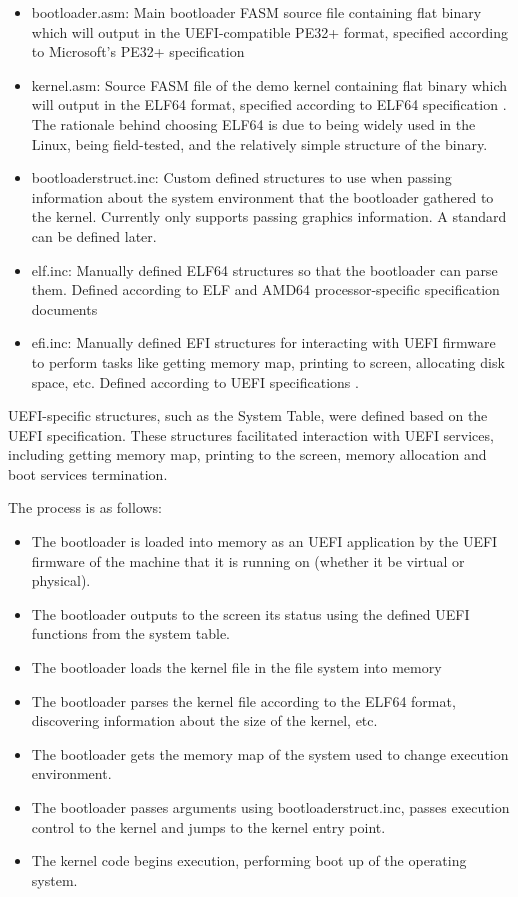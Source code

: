 \documentclass[conference]{IEEEtran}
\begin{document}
\begin{itemize}
    \item bootloader.asm: Main bootloader FASM source file containing flat binary which will output in the UEFI-compatible PE32+ format, specified according to Microsoft's PE32+ specification \cite{pe}
    \item kernel.asm: Source FASM file of the demo kernel containing flat binary which will output in the ELF64 format, specified according to ELF64 specification \cite{elflatest}. The rationale behind choosing ELF64 is due to being widely used in the Linux, being field-tested, and the relatively simple structure of the binary.
    \item bootloaderstruct.inc: Custom defined structures to use when passing information about the system environment that the bootloader gathered to the kernel. Currently only supports passing graphics information. A standard can be defined later.
    \item elf.inc: Manually defined ELF64 structures so that the bootloader can parse them. Defined according to ELF \cite{elflatest} and AMD64 processor-specific \cite{supplement64} specification documents
    \item efi.inc: Manually defined EFI structures for interacting with UEFI firmware to perform tasks like getting memory map, printing to screen, allocating disk space, etc. Defined according to UEFI specifications \cite{uefi}.
\end{itemize}


UEFI-specific structures, such as the System Table, were defined based on the UEFI specification. These structures facilitated interaction with UEFI services, including getting memory map, printing to the screen, memory allocation and boot services termination.

The process is as follows:

\begin{itemize}
    \item The bootloader is loaded into memory as an UEFI application by the UEFI firmware of the machine that it is running on (whether it be virtual or physical).
    \item The bootloader outputs to the screen its status using the defined UEFI functions from the system table.
    \item The bootloader loads the kernel file in the file system into memory
    \item The bootloader parses the kernel file according to the ELF64 format, discovering information about the size of the kernel, etc.
    \item The bootloader gets the memory map of the system used to change execution environment.
    \item The bootloader passes arguments using bootloaderstruct.inc, passes execution control to the kernel and jumps to the kernel entry point.
    \item The kernel code begins execution, performing boot up of the operating system.
\end{itemize}
\end{document}
